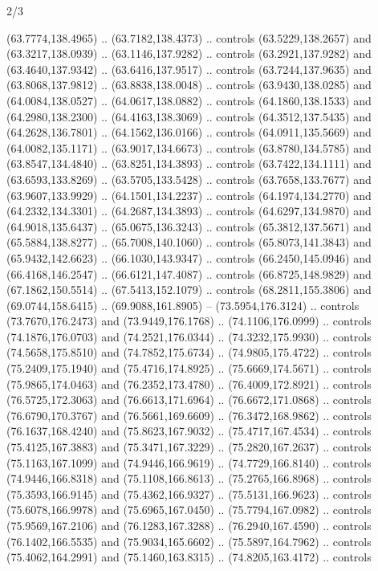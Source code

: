 \begin{flagdescription}{2/3}
\begin{scope}[shift={(0.5\flaglength,0.5)},scale=\flagwidth/320]
\begin{scope}[y=0.8pt, x=0.8pt, yscale=-1,shift={(-118.3,-146)}]
  (63.7774,138.4965) .. (63.7182,138.4373) .. controls (63.5229,138.2657) and
  (63.3217,138.0939) .. (63.1146,137.9282) .. controls (63.2921,137.9282) and
  (63.4640,137.9342) .. (63.6416,137.9517) .. controls (63.7244,137.9635) and
  (63.8068,137.9812) .. (63.8838,138.0048) .. controls (63.9430,138.0285) and
  (64.0084,138.0527) .. (64.0617,138.0882) .. controls (64.1860,138.1533) and
  (64.2980,138.2300) .. (64.4163,138.3069) .. controls (64.3512,137.5435) and
  (64.2628,136.7801) .. (64.1562,136.0166) .. controls (64.0911,135.5669) and
  (64.0082,135.1171) .. (63.9017,134.6673) .. controls (63.8780,134.5785) and
  (63.8547,134.4840) .. (63.8251,134.3893) .. controls (63.7422,134.1111) and
  (63.6593,133.8269) .. (63.5705,133.5428) .. controls (63.7658,133.7677) and
  (63.9607,133.9929) .. (64.1501,134.2237) .. controls (64.1974,134.2770) and
  (64.2332,134.3301) .. (64.2687,134.3893) .. controls (64.6297,134.9870) and
  (64.9018,135.6437) .. (65.0675,136.3243) .. controls (65.3812,137.5671) and
  (65.5884,138.8277) .. (65.7008,140.1060) .. controls (65.8073,141.3843) and
  (65.9432,142.6623) .. (66.1030,143.9347) .. controls (66.2450,145.0946) and
  (66.4168,146.2547) .. (66.6121,147.4087) .. controls (66.8725,148.9829) and
  (67.1862,150.5514) .. (67.5413,152.1079) .. controls (68.2811,155.3806) and
  (69.0744,158.6415) .. (69.9088,161.8905) -- (73.5954,176.3124) .. controls
  (73.7670,176.2473) and (73.9449,176.1768) .. (74.1106,176.0999) .. controls
  (74.1876,176.0703) and (74.2521,176.0344) .. (74.3232,175.9930) .. controls
  (74.5658,175.8510) and (74.7852,175.6734) .. (74.9805,175.4722) .. controls
  (75.2409,175.1940) and (75.4716,174.8925) .. (75.6669,174.5671) .. controls
  (75.9865,174.0463) and (76.2352,173.4780) .. (76.4009,172.8921) .. controls
  (76.5725,172.3063) and (76.6613,171.6964) .. (76.6672,171.0868) .. controls
  (76.6790,170.3767) and (76.5661,169.6609) .. (76.3472,168.9862) .. controls
  (76.1637,168.4240) and (75.8623,167.9032) .. (75.4717,167.4534) .. controls
  (75.4125,167.3883) and (75.3471,167.3229) .. (75.2820,167.2637) .. controls
  (75.1163,167.1099) and (74.9446,166.9619) .. (74.7729,166.8140) .. controls
  (74.9446,166.8318) and (75.1108,166.8613) .. (75.2765,166.8968) .. controls
  (75.3593,166.9145) and (75.4362,166.9327) .. (75.5131,166.9623) .. controls
  (75.6078,166.9978) and (75.6965,167.0450) .. (75.7794,167.0982) .. controls
  (75.9569,167.2106) and (76.1283,167.3288) .. (76.2940,167.4590) .. controls
  (76.1402,166.5535) and (75.9034,165.6602) .. (75.5897,164.7962) .. controls
  (75.4062,164.2991) and (75.1460,163.8315) .. (74.8205,163.4172) .. controls

\end{scope}
\end{scope}
\end{flagdescription}
